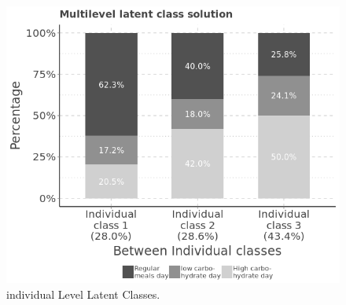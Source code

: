 \begin{figure}
	\centering
	\includegraphics[width=13cm]{Figures/level2.png}
	\decoRule
	\caption[Individual Level Latent Classes.]{individual Level Latent Classes.}
	\label{fig:level2}
\end{figure}
\vspace{-0.6cm}



